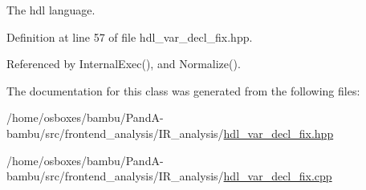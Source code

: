 The hdl language. 



Definition at line 57 of file hdl\+\_\+var\+\_\+decl\+\_\+fix.\+hpp.



Referenced by Internal\+Exec(), and Normalize().



The documentation for this class was generated from the following files\+:\begin{DoxyCompactItemize}
\item 
/home/osboxes/bambu/\+Pand\+A-\/bambu/src/frontend\+\_\+analysis/\+I\+R\+\_\+analysis/\hyperlink{hdl__var__decl__fix_8hpp}{hdl\+\_\+var\+\_\+decl\+\_\+fix.\+hpp}\item 
/home/osboxes/bambu/\+Pand\+A-\/bambu/src/frontend\+\_\+analysis/\+I\+R\+\_\+analysis/\hyperlink{hdl__var__decl__fix_8cpp}{hdl\+\_\+var\+\_\+decl\+\_\+fix.\+cpp}\end{DoxyCompactItemize}
